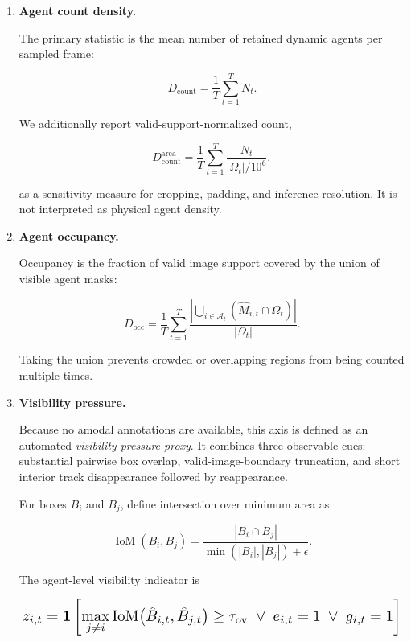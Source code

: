 \begin{enumerate}

\item \textbf{Agent count density.}

The primary statistic is the mean number of retained dynamic agents per
sampled frame:

\[
D_{\mathrm{count}}
=
\frac{1}{T}
\sum_{t=1}^{T}N_t.
\]

We additionally report valid-support-normalized count,

\[
D_{\mathrm{count}}^{\mathrm{area}}
=
\frac{1}{T}
\sum_{t=1}^{T}
\frac{N_t}{|\Omega_t|/10^6},
\]

as a sensitivity measure for cropping, padding, and inference
resolution. It is not interpreted as physical agent density.

\item \textbf{Agent occupancy.}

Occupancy is the fraction of valid image support covered by the union
of visible agent masks:

\[
D_{\mathrm{occ}}
=
\frac{1}{T}
\sum_{t=1}^{T}
\frac{
\left|
\displaystyle
\bigcup_{i\in\mathcal A_t}
(\hat M_{i,t}\cap\Omega_t)
\right|
}{
|\Omega_t|
}.
\]

Taking the union prevents crowded or overlapping regions from being
counted multiple times.

\item \textbf{Visibility pressure.}

Because no amodal annotations are available, this axis is defined as an
automated \emph{visibility-pressure proxy}. It combines three
observable cues: substantial pairwise box overlap, valid-image-boundary
truncation, and short interior track disappearance followed by
reappearance.

For boxes \(B_i\) and \(B_j\), define intersection over minimum area as

\[
\operatorname{IoM}(B_i,B_j)
=
\frac{
|B_i\cap B_j|
}{
\min(|B_i|,|B_j|)+\epsilon
}.
\]

The agent-level visibility indicator is

\begin{equation*}
\resizebox{0.98\columnwidth}{!}{$\displaystyle
z_{i,t}
=
\mathbf 1
\left[
\max_{j\ne i}
\operatorname{IoM}
\bigl(\hat B_{i,t},\hat B_{j,t}\bigr)
\ge\tau_{\mathrm{ov}}
\;\lor\;
e_{i,t}=1
\;\lor\;
g_{i,t}=1
\right]
$}
\end{equation*}


\end{enumerate}
